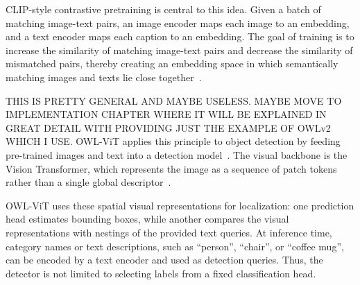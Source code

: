 
CLIP-style contrastive pretraining is central to this idea. Given a batch of matching image-text pairs, an image encoder maps each image to an embedding, and a text encoder maps each caption to an embedding. The goal of training is to increase the similarity of matching image-text pairs and decrease the similarity of mismatched pairs, thereby creating an embedding space in which semantically matching images and texts lie close together~\cite{pmlr-v139-radford21a}.


THIS IS PRETTY GENERAL AND MAYBE USELESS. MAYBE MOVE TO IMPLEMENTATION CHAPTER WHERE IT WILL BE EXPLAINED IN GREAT DETAIL WITH PROVIDING JUST THE EXAMPLE OF OWLv2 WHICH I USE. OWL-ViT applies this principle to object detection by feeding pre-trained images and text into a detection model~\cite{minderer_simple_2022}. The visual backbone is the Vision Transformer, which represents the image as a sequence of patch tokens rather than a single global descriptor~\cite{dosovitskiy2021imageworth16x16words}.


OWL-ViT uses these spatial visual representations for localization: one prediction head estimates bounding boxes, while another compares the visual representations with nestings of the provided text queries. At inference time, category names or text descriptions, such as \enquote{person}, \enquote{chair}, or \enquote{coffee mug}, can be encoded by a text encoder and used as detection queries. Thus, the detector is not limited to selecting labels from a fixed classification head.



